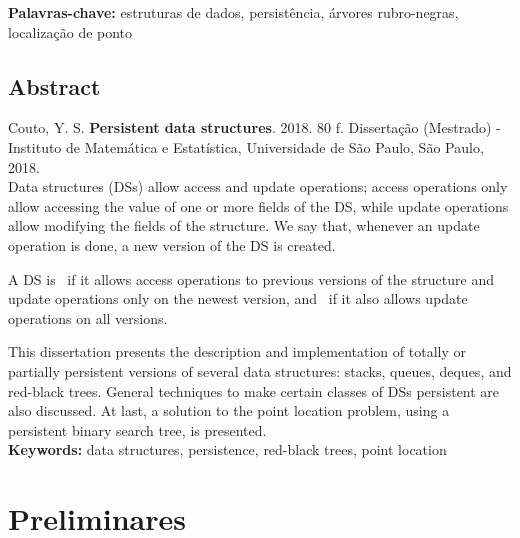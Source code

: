 \documentclass[11pt,oneside,a4paper, openany]{book}
\begin{document}
\noindent \textbf{Palavras-chave:} estruturas de dados, persistência, árvores rubro-negras, localização de ponto

\chapter*{Abstract}
\noindent Couto, Y. S. \textbf{Persistent data structures}. 
2018. 80 f.
Dissertação (Mestrado) - Instituto de Matemática e Estatística,
Universidade de São Paulo, São Paulo, 2018.
\\

Data structures (DSs) allow access and update operations; access operations only allow accessing the value of one or more fields of the DS, while update operations allow modifying the fields of the structure. We say that, whenever an update operation is done, a new version of the DS is created.

A DS is~ if it allows access operations to previous versions of the structure and update operations only on the newest version, and~ if it also allows update operations on all versions.

This dissertation presents the description and implementation of totally or partially persistent versions of several data structures: stacks, queues, deques, and red-black trees. General techniques to make certain classes of DSs persistent are also discussed. At last, a solution to the point location problem, using a persistent binary search tree, is presented.
\\

\noindent \textbf{Keywords:} data structures, persistence, red-black trees, point location


\setcounter{tocdepth}{1}

\begingroup
\let\cleardoublepage\clearpage
\tableofcontents
\endgroup

\mainmatter
{}



\part{Preliminares} \label{part:prelim}
%




\end{document}
